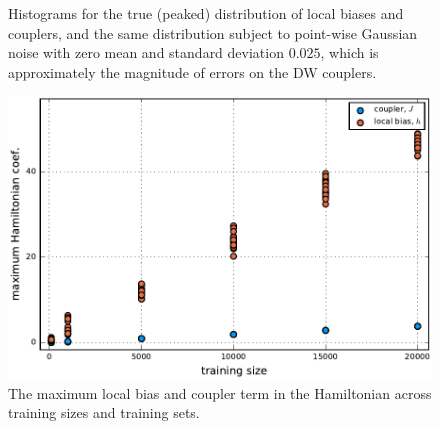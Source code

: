 \begin{figure}
\centering
{}
\caption{Histograms for the true (peaked) distribution of local biases and couplers, and the same distribution subject to point-wise Gaussian noise with zero mean and standard deviation $0.025$, which is approximately the magnitude of errors on the DW couplers.}
  \label{fig:noisyJ}
  \end{figure}

  \begin{figure}[hbb]
 \centering
  \includegraphics[width=0.7\columnwidth]{chapters/Higgs/precision_by_training_size_and_fold_unnormalized}
  \caption{The maximum local bias and coupler term in the Hamiltonian across training sizes and training sets.}
  \label{fig:precision_un}
\end{figure}

